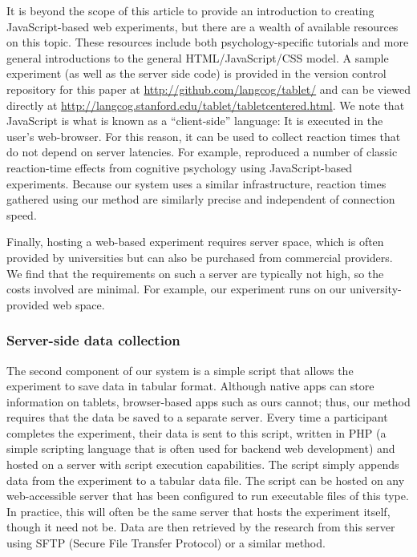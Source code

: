 \documentclass[man,noapacite]{apa2}
\begin{document}
It is beyond the scope of this article to provide an introduction to creating JavaScript-based web experiments, but there are a wealth of available resources on this topic. These resources include both psychology-specific tutorials and more general introductions to the general HTML/JavaScript/CSS model. A sample experiment (as well as the server side code) is provided in the version control repository for this paper  at \url{http://github.com/langcog/tablet/} and can be viewed directly at \url{http://langcog.stanford.edu/tablet/tabletcentered.html}. We note that JavaScript is what is known as a ``client-side'' language: It is executed in the user's web-browser. For this reason, it can be used to collect reaction times that do not depend on server latencies. For example,  reproduced a number of classic reaction-time effects from cognitive psychology using JavaScript-based experiments. Because our system uses a similar infrastructure, reaction times gathered using our method are similarly precise and independent of connection speed. 

Finally, hosting a web-based experiment requires server space, which is often provided by universities but can also be purchased from commercial providers. We find that the requirements on such a server are typically not high, so the costs involved are minimal. For example, our experiment runs on our university-provided web space.


\subsubsection{Server-side data collection}

The second component of our system is a simple script that allows the experiment to save data in tabular format. Although native apps can store information on tablets, browser-based apps such as ours cannot; thus, our method requires that the data be saved to a separate server. Every time a participant completes the experiment, their data is sent to this script, written in PHP (a simple scripting language that is often used for backend web development) and hosted on a server with script execution capabilities. The script simply appends data from the experiment to a tabular data file. The script can be hosted on any web-accessible server that has been configured to run executable files of this type. In practice, this will often be the same server that hosts the experiment itself, though it need not be. Data are then retrieved by the research from this server using SFTP (Secure File Transfer Protocol) or a similar method. 
\end{document}
